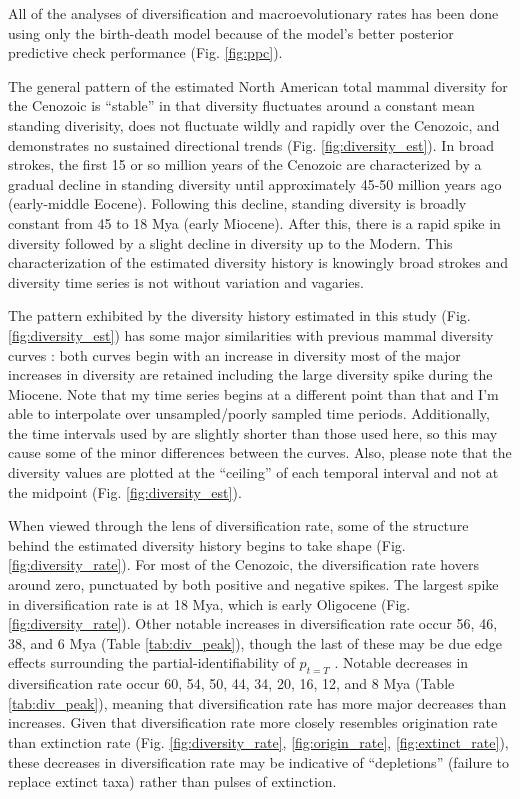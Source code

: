 \documentclass[12pt,letterpaper]{article}
\begin{document}
All of the analyses of diversification and macroevolutionary rates has been done using only the birth-death model because of the model's better posterior predictive check performance (Fig. \ref{fig:ppc}).


The general pattern of the estimated North American total mammal diversity for the Cenozoic is ``stable'' in that diversity fluctuates around a constant mean standing diverisity, does not fluctuate wildly and rapidly over the Cenozoic, and demonstrates no sustained directional trends (Fig. \ref{fig:diversity_est}). In broad strokes, the first 15 or so million years of the Cenozoic are characterized by a gradual decline in standing diversity until approximately 45-50 million years ago (early-middle Eocene). Following this decline, standing diversity is broadly constant from 45 to 18 Mya (early Miocene). After this, there is a rapid spike in diversity followed by a slight decline in diversity up to the Modern. This characterization of the estimated diversity history is knowingly broad strokes and diversity time series is not without variation and vagaries.

The pattern exhibited by the diversity history estimated in this study (Fig. \ref{fig:diversity_est}) has some major similarities with previous mammal diversity curves \citep{Alroy2009}: both curves begin with an increase in diversity most of the major increases in diversity are retained including the large diversity spike during the Miocene. Note that my time series begins at a different point than that \citet{Alroy2009} and I'm able to interpolate over unsampled/poorly sampled time periods. Additionally, the time intervals used by \citet{Alroy2009} are slightly shorter than those used here, so this may cause some of the minor differences between the curves. Also, please note that the diversity values are plotted at the ``ceiling'' of each temporal interval and not at the midpoint (Fig. \ref{fig:diversity_est}).

When viewed through the lens of diversification rate, some of the structure behind the estimated diversity history begins to take shape (Fig. \ref{fig:diversity_rate}). For most of the Cenozoic, the diversification rate hovers around zero, punctuated by both positive and negative spikes. The largest spike in diversification rate is at 18 Mya, which is early Oligocene (Fig. \ref{fig:diversity_rate}). Other notable increases in diversification rate occur 56, 46, 38, and 6 Mya (Table \ref{tab:div_peak}), though the last of these may be due edge effects surrounding the partial-identifiability of \(p_{t = T}\) . Notable decreases in diversification rate occur 60, 54, 50, 44, 34, 20, 16, 12, and 8 Mya (Table \ref{tab:div_peak}), meaning that diversification rate has more major decreases than increases. Given that diversification rate more closely resembles origination rate than extinction rate (Fig. \ref{fig:diversity_rate}, \ref{fig:origin_rate}, \ref{fig:extinct_rate}), these decreases in diversification rate may be indicative of ``depletions'' (failure to replace extinct taxa) rather than pulses of extinction.
\end{document}
